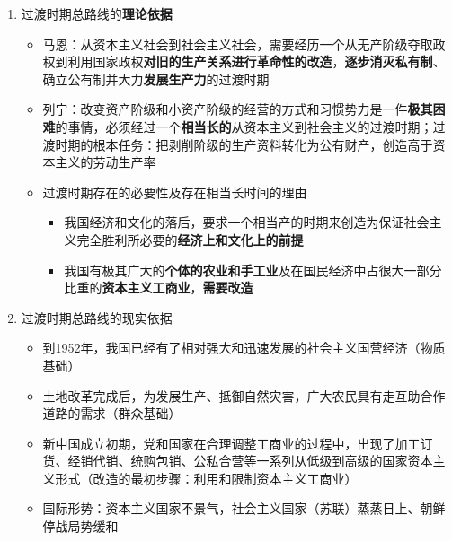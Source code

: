 \documentclass[12pt,openany]{ctexbook}
\begin{document}
\begin{enumerate}
\begin{itemize}
\begin{itemize}
\end{itemize}
  \item 总路线表述（1953年12月确定，1954年2月党的七届四中全会正式确认）
  \par 从中华人民共和国成立，到社会主义改造基本完成，这是一个过渡时期。党在这个过渡时期的总路线和总任务，是要在一个相当长的时期内，逐步实现国家的\textbf{社会主义工业化}，并逐步实现国家对\textbf{农业}、对\textbf{手工业}和对\textbf{资本主义工商业}的\textbf{社会主义改造}
  \par $\Longrightarrow$“\textbf{一化三改}”，一化是主体，三改是两翼，二者相辅相成，相互促进
\end{itemize}
  \item 过渡时期总路线的\textbf{理论依据}
\begin{itemize}
  \item 马恩：从资本主义社会到社会主义社会，需要经历一个从无产阶级夺取政权到利用国家政权\textbf{对旧的生产关系进行革命性的改造}，\textbf{逐步消灭私有制}、确立公有制并大力\textbf{发展生产力}的过渡时期
  \item 列宁：改变资产阶级和小资产阶级的经营的方式和习惯势力是一件\textbf{极其困难}的事情，必须经过一个\textbf{相当长的}从资本主义到社会主义的过渡时期；过渡时期的根本任务：把剥削阶级的生产资料转化为公有财产，创造高于资本主义的劳动生产率
  \item 过渡时期存在的必要性及存在相当长时间的理由
\begin{itemize}
  \item 我国经济和文化的落后，要求一个相当产的时期来创造为保证社会主义完全胜利所必要的\textbf{经济上和文化上的前提}
  \item 我国有极其广大的\textbf{个体的农业和手工业}及在国民经济中占很大一部分比重的\textbf{资本主义工商业}，\textbf{需要改造}
\end{itemize}
\end{itemize}
  \item 过渡时期总路线的现实依据
\begin{itemize}
  \item 到1952年，我国已经有了相对强大和迅速发展的社会主义国营经济（物质基础）
  \item 土地改革完成后，为发展生产、抵御自然灾害，广大农民具有走互助合作道路的需求（群众基础）
  \item 新中国成立初期，党和国家在合理调整工商业的过程中，出现了加工订货、经销代销、统购包销、公私合营等一系列从低级到高级的国家资本主义形式（改造的最初步骤：利用和限制资本主义工商业）
  \item 国际形势：资本主义国家不景气，社会主义国家（苏联）蒸蒸日上、朝鲜停战局势缓和
\end{itemize}
\end{enumerate}
\end{document}
